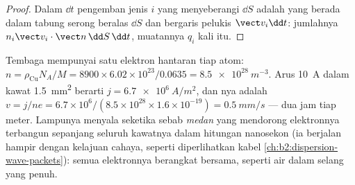 \begin{proof}
Dalam $\dd t$ pengemban jenis $i$ yang menyeberangi $\dd S$ adalah yang berada dalam
tabung serong beralas $\dd S$ dan bergaris pelukis $\vect v_i\dd t$: jumlahnya
$n_i\vect v_i\cdot\vect n\,\dd S\,\dd t$, muatannya $q_i$ kali itu.
\end{proof}

\begin{example}\label{ex:b2:charges-currents-conduction:drift}
Tembaga mempunyai satu elektron hantaran tiap atom: $n = \rho_{\text{Cu}}N_A/M =
8900 \times 6.02 \times 10^{23}/0.0635 = \qty{8.5e28}{m^{-3}}$. Arus
\qty{10}{A} dalam kawat \qty{1.5}{mm^2} berarti $j = \qty{6.7e6}{A/m^2}$, dan
\emph{}nya adalah $v = j/ne = 6.7 \times 10^6/(8.5 \times 10^{28} \times 1.6 \times
10^{-19}) = \qty{0.5}{mm/s}$ --- dua jam tiap meter. Lampunya menyala
seketika sebab \emph{medan} yang mendorong elektronnya terbangun
sepanjang seluruh kawatnya dalam hitungan nanosekon (ia berjalan hampir
dengan kelajuan cahaya, seperti diperlihatkan kabel \cref{ch:b2:dispersion-wave-packets}):
semua elektronnya berangkat bersama, seperti air dalam selang yang penuh.
\end{example}

